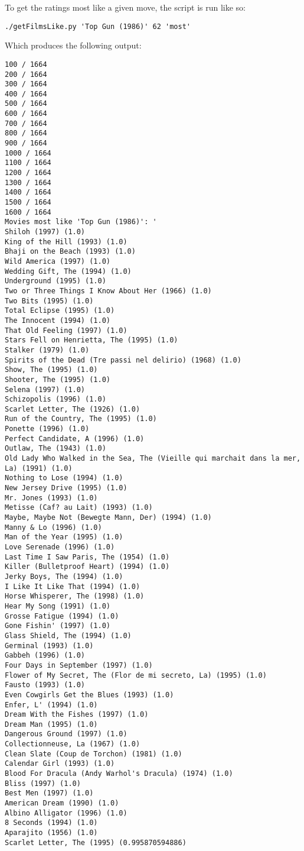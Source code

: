 \documentclass[letterpaper,11pt]{article}
\begin{document}


To get the ratings most like a given move, the script is run like so:
\begin{lstlisting}
./getFilmsLike.py 'Top Gun (1986)' 62 'most'
\end{lstlisting}

Which produces the following output:
\begin{lstlisting}[frame=single]
100 / 1664
200 / 1664
300 / 1664
400 / 1664
500 / 1664
600 / 1664
700 / 1664
800 / 1664
900 / 1664
1000 / 1664
1100 / 1664
1200 / 1664
1300 / 1664
1400 / 1664
1500 / 1664
1600 / 1664
Movies most like 'Top Gun (1986)': '
Shiloh (1997) (1.0)
King of the Hill (1993) (1.0)
Bhaji on the Beach (1993) (1.0)
Wild America (1997) (1.0)
Wedding Gift, The (1994) (1.0)
Underground (1995) (1.0)
Two or Three Things I Know About Her (1966) (1.0)
Two Bits (1995) (1.0)
Total Eclipse (1995) (1.0)
The Innocent (1994) (1.0)
That Old Feeling (1997) (1.0)
Stars Fell on Henrietta, The (1995) (1.0)
Stalker (1979) (1.0)
Spirits of the Dead (Tre passi nel delirio) (1968) (1.0)
Show, The (1995) (1.0)
Shooter, The (1995) (1.0)
Selena (1997) (1.0)
Schizopolis (1996) (1.0)
Scarlet Letter, The (1926) (1.0)
Run of the Country, The (1995) (1.0)
Ponette (1996) (1.0)
Perfect Candidate, A (1996) (1.0)
Outlaw, The (1943) (1.0)
Old Lady Who Walked in the Sea, The (Vieille qui marchait dans la mer, La) (1991) (1.0)
Nothing to Lose (1994) (1.0)
New Jersey Drive (1995) (1.0)
Mr. Jones (1993) (1.0)
Metisse (Caf? au Lait) (1993) (1.0)
Maybe, Maybe Not (Bewegte Mann, Der) (1994) (1.0)
Manny & Lo (1996) (1.0)
Man of the Year (1995) (1.0)
Love Serenade (1996) (1.0)
Last Time I Saw Paris, The (1954) (1.0)
Killer (Bulletproof Heart) (1994) (1.0)
Jerky Boys, The (1994) (1.0)
I Like It Like That (1994) (1.0)
Horse Whisperer, The (1998) (1.0)
Hear My Song (1991) (1.0)
Grosse Fatigue (1994) (1.0)
Gone Fishin' (1997) (1.0)
Glass Shield, The (1994) (1.0)
Germinal (1993) (1.0)
Gabbeh (1996) (1.0)
Four Days in September (1997) (1.0)
Flower of My Secret, The (Flor de mi secreto, La) (1995) (1.0)
Fausto (1993) (1.0)
Even Cowgirls Get the Blues (1993) (1.0)
Enfer, L' (1994) (1.0)
Dream With the Fishes (1997) (1.0)
Dream Man (1995) (1.0)
Dangerous Ground (1997) (1.0)
Collectionneuse, La (1967) (1.0)
Clean Slate (Coup de Torchon) (1981) (1.0)
Calendar Girl (1993) (1.0)
Blood For Dracula (Andy Warhol's Dracula) (1974) (1.0)
Bliss (1997) (1.0)
Best Men (1997) (1.0)
American Dream (1990) (1.0)
Albino Alligator (1996) (1.0)
8 Seconds (1994) (1.0)
Aparajito (1956) (1.0)
Scarlet Letter, The (1995) (0.995870594886)
\end{lstlisting}
\end{document}
